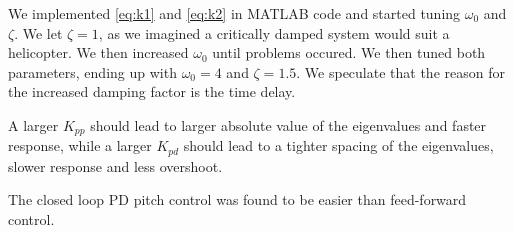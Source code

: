 We implemented \cref{eq:k1} and \cref{eq:k2} in MATLAB code and started tuning $\omega_0$ and $\zeta$. We let $\zeta=1$, as we imagined a critically damped system would suit a helicopter. We then increased $\omega_0$ until problems occured. We then tuned both parameters, ending up with $\omega_0 = 4$ and $\zeta=1.5$. We speculate that the reason for the increased damping factor is the time delay.

A larger $K_{pp}$ should lead to larger absolute value of the eigenvalues and faster response, while a larger $K_{pd}$ should lead to a tighter spacing of the eigenvalues, slower response and less overshoot.

The closed loop PD pitch control was found to be easier than feed-forward control.

